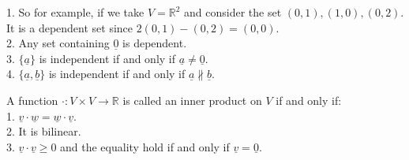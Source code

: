 \begin{example}
    1. So for example, if we take $V=\mathbb R^2$ and consider the set $(0,1),(1,0),(0,2)$.
    It is a dependent set since $2(0,1)-(0,2)=(0,0)$.\\
    2. Any set containing $\underline{0}$ is dependent.\\
    3. $\{\underline{a}\}$ is independent if and only if $\underline{a}\neq\underline{0}$.\\
    4. $\{\underline{a},\underline{b}\}$ is independent if and only if $\underline{a}\nparallel\underline{b}$.
\end{example}
\begin{definition}
    A function $\cdot:V\times V\to\mathbb R$ is called an inner product on $V$ if and only if:\\
    1. $\underline{v}\cdot\underline{w}=\underline{w}\cdot\underline{v}$.\\
    2. It is bilinear.\\
    3. $\underline{v}\cdot\underline{v}\ge 0$ and the equality hold if and only if $\underline{v}=\underline{0}$.
\end{definition}
